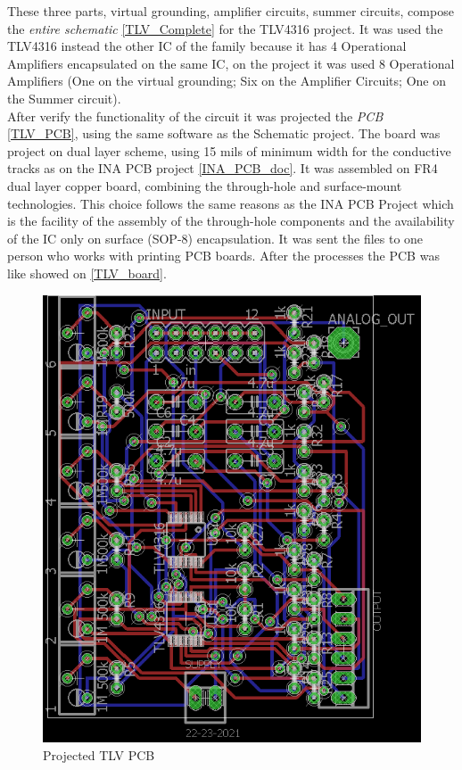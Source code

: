 These three parts, virtual grounding, amplifier circuits, summer circuits, compose the \textit{entire schematic} \autoref{TLV_Complete} for the TLV4316 project. It was used the TLV4316 instead the other IC of the family
because it has 4 Operational Amplifiers encapsulated on the same IC, on the project it was used 8 Operational Amplifiers (One on the virtual grounding; Six on the Amplifier Circuits; One on
the Summer circuit).\\

After verify the functionality of the circuit it was projected the \textit{PCB} \autoref{TLV_PCB}, using the same software as the Schematic project. The board was project on dual layer
scheme, using 15 mils of minimum width for the conductive tracks as on the INA PCB project \autoref{INA_PCB_doc}. It was assembled on FR4 dual layer copper
board, combining the through-hole and surface-mount technologies. This choice follows the same reasons as the INA PCB Project which is
the facility of the assembly of the through-hole components and the availability
of the IC only on surface (SOP-8) encapsulation. It was sent
the files to one person who works with printing PCB boards. After the processes
the PCB was like showed on \autoref{TLV_board}.\\

\begin{figure}[!htpb]
\centering
\caption{Projected TLV PCB}
\label{TLV_PCB}
\includegraphics[scale=1.8]{images/tlv_b}
\end{figure}

